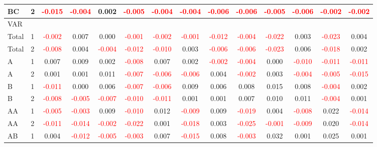 \begin{table}[!htb]
{\begin{tabular}{llcccccccccccc}
BC & 2 & \textcolor{red}{-0.015} & \textcolor{red}{-0.004} & 0.002 & \textcolor{red}{-0.005} & \textcolor{red}{-0.004} & \textcolor{red}{-0.004} & \textcolor{red}{-0.006} & \textcolor{red}{-0.006} & \textcolor{red}{-0.005} & \textcolor{red}{-0.006} & \textcolor{red}{-0.002} & \textcolor{red}{-0.002}\\
\hline
VAR &  &  &  &  &  &  &  &  &  &  &  &  & \\
\hline
Total & 1 & \textcolor{red}{-0.002} & 0.007 & 0.000 & \textcolor{red}{-0.001} & \textcolor{red}{-0.002} & \textcolor{red}{-0.001} & \textcolor{red}{-0.012} & \textcolor{red}{-0.004} & \textcolor{red}{-0.022} & 0.003 & \textcolor{red}{-0.023} & 0.004\\
Total & 2 & \textcolor{red}{-0.008} & 0.004 & \textcolor{red}{-0.004} & \textcolor{red}{-0.012} & \textcolor{red}{-0.010} & 0.003 & \textcolor{red}{-0.006} & \textcolor{red}{-0.006} & \textcolor{red}{-0.023} & 0.006 & \textcolor{red}{-0.018} & 0.002\\
A & 1 & 0.007 & 0.009 & 0.002 & \textcolor{red}{-0.008} & 0.007 & 0.002 & \textcolor{red}{-0.002} & \textcolor{red}{-0.004} & 0.000 & \textcolor{red}{-0.010} & \textcolor{red}{-0.011} & \textcolor{red}{-0.011}\\
A & 2 & 0.001 & 0.001 & 0.011 & \textcolor{red}{-0.007} & \textcolor{red}{-0.006} & \textcolor{red}{-0.006} & 0.004 & \textcolor{red}{-0.002} & 0.003 & \textcolor{red}{-0.004} & \textcolor{red}{-0.005} & \textcolor{red}{-0.015}\\
B & 1 & \textcolor{red}{-0.011} & 0.000 & 0.006 & \textcolor{red}{-0.007} & \textcolor{red}{-0.006} & 0.009 & 0.006 & 0.008 & 0.015 & 0.008 & \textcolor{red}{-0.004} & 0.002\\
B & 2 & \textcolor{red}{-0.008} & \textcolor{red}{-0.005} & \textcolor{red}{-0.007} & \textcolor{red}{-0.010} & \textcolor{red}{-0.011} & 0.001 & 0.001 & 0.007 & 0.010 & 0.011 & \textcolor{red}{-0.004} & 0.001\\
AA & 1 & \textcolor{red}{-0.005} & \textcolor{red}{-0.003} & 0.009 & \textcolor{red}{-0.010} & 0.012 & \textcolor{red}{-0.009} & 0.009 & \textcolor{red}{-0.019} & 0.004 & \textcolor{red}{-0.008} & 0.022 & \textcolor{red}{-0.014}\\
AA & 2 & \textcolor{red}{-0.011} & \textcolor{red}{-0.014} & \textcolor{red}{-0.002} & \textcolor{red}{-0.022} & 0.001 & \textcolor{red}{-0.018} & 0.003 & \textcolor{red}{-0.025} & \textcolor{red}{-0.001} & \textcolor{red}{-0.009} & 0.020 & \textcolor{red}{-0.014}\\
AB & 1 & 0.004 & \textcolor{red}{-0.012} & \textcolor{red}{-0.005} & \textcolor{red}{-0.003} & 0.007 & \textcolor{red}{-0.015} & 0.008 & \textcolor{red}{-0.003} & 0.032 & 0.001 & 0.025 & 0.001\\

\end{tabular}}
\end{table}
